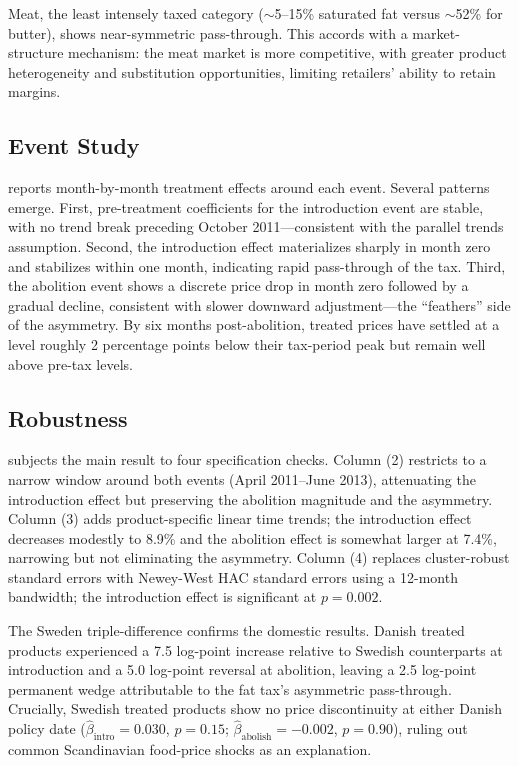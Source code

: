 \documentclass[12pt]{article}
\begin{document}
Meat, the least intensely taxed category ($\sim$5--15\% saturated fat versus $\sim$52\% for butter), shows near-symmetric pass-through. This accords with a market-structure mechanism: the meat market is more competitive, with greater product heterogeneity and substitution opportunities, limiting retailers' ability to retain margins.

\subsection{Event Study}



 reports month-by-month treatment effects around each event. Several patterns emerge. First, pre-treatment coefficients for the introduction event are stable, with no trend break preceding October 2011---consistent with the parallel trends assumption. Second, the introduction effect materializes sharply in month zero and stabilizes within one month, indicating rapid pass-through of the tax. Third, the abolition event shows a discrete price drop in month zero followed by a gradual decline, consistent with slower downward adjustment---the ``feathers'' side of the asymmetry. By six months post-abolition, treated prices have settled at a level roughly 2 percentage points below their tax-period peak but remain well above pre-tax levels.

\subsection{Robustness}



 subjects the main result to four specification checks. Column (2) restricts to a narrow window around both events (April 2011--June 2013), attenuating the introduction effect but preserving the abolition magnitude and the asymmetry. Column (3) adds product-specific linear time trends; the introduction effect decreases modestly to 8.9\% and the abolition effect is somewhat larger at 7.4\%, narrowing but not eliminating the asymmetry. Column (4) replaces cluster-robust standard errors with Newey-West HAC standard errors using a 12-month bandwidth; the introduction effect is significant at $p = 0.002$.

The Sweden triple-difference confirms the domestic results. Danish treated products experienced a 7.5 log-point increase relative to Swedish counterparts at introduction and a 5.0 log-point reversal at abolition, leaving a 2.5 log-point permanent wedge attributable to the fat tax's asymmetric pass-through. Crucially, Swedish treated products show no price discontinuity at either Danish policy date ($\hat{\beta}_{\text{intro}} = 0.030$, $p = 0.15$; $\hat{\beta}_{\text{abolish}} = -0.002$, $p = 0.90$), ruling out common Scandinavian food-price shocks as an explanation.
\end{document}
